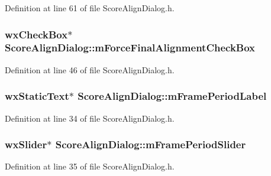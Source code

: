 Definition at line 61 of file Score\+Align\+Dialog.\+h.

\subsubsection[{\texorpdfstring{m\+Force\+Final\+Alignment\+Check\+Box}{mForceFinalAlignmentCheckBox}}]{\setlength{\rightskip}{0pt plus 5cm}wx\+Check\+Box$\ast$ Score\+Align\+Dialog\+::m\+Force\+Final\+Alignment\+Check\+Box}\hypertarget{class_score_align_dialog_af4f0ed43597b7062264df46f75cddb86}{}\label{class_score_align_dialog_af4f0ed43597b7062264df46f75cddb86}


Definition at line 46 of file Score\+Align\+Dialog.\+h.

\subsubsection[{\texorpdfstring{m\+Frame\+Period\+Label}{mFramePeriodLabel}}]{\setlength{\rightskip}{0pt plus 5cm}wx\+Static\+Text$\ast$ Score\+Align\+Dialog\+::m\+Frame\+Period\+Label}\hypertarget{class_score_align_dialog_ab408f74fc2c570780911d012c4204ae7}{}\label{class_score_align_dialog_ab408f74fc2c570780911d012c4204ae7}


Definition at line 34 of file Score\+Align\+Dialog.\+h.

\subsubsection[{\texorpdfstring{m\+Frame\+Period\+Slider}{mFramePeriodSlider}}]{\setlength{\rightskip}{0pt plus 5cm}wx\+Slider$\ast$ Score\+Align\+Dialog\+::m\+Frame\+Period\+Slider}\hypertarget{class_score_align_dialog_a28b06a137fb914700d79f8675b622281}{}\label{class_score_align_dialog_a28b06a137fb914700d79f8675b622281}


Definition at line 35 of file Score\+Align\+Dialog.\+h.

